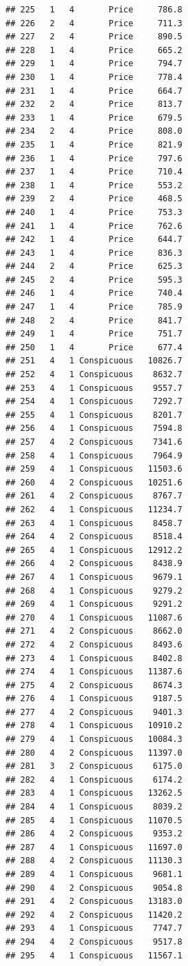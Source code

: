 \documentclass[12pt,]{krantz}
\theoremstyle{definition}
\theoremstyle{definition}
\theoremstyle{remark}
\begin{document}
\begin{verbatim}
## 225   1   4       Price     786.8
## 226   2   4       Price     711.3
## 227   2   4       Price     890.5
## 228   1   4       Price     665.2
## 229   1   4       Price     794.7
## 230   1   4       Price     778.4
## 231   1   4       Price     664.7
## 232   2   4       Price     813.7
## 233   1   4       Price     679.5
## 234   2   4       Price     808.0
## 235   1   4       Price     821.9
## 236   1   4       Price     797.6
## 237   1   4       Price     710.4
## 238   1   4       Price     553.2
## 239   2   4       Price     468.5
## 240   1   4       Price     753.3
## 241   1   4       Price     762.6
## 242   1   4       Price     644.7
## 243   1   4       Price     836.3
## 244   2   4       Price     625.3
## 245   2   4       Price     595.3
## 246   1   4       Price     740.4
## 247   1   4       Price     785.9
## 248   2   4       Price     841.7
## 249   1   4       Price     751.7
## 250   1   4       Price     677.4
## 251   4   1 Conspicuous   10826.7
## 252   4   1 Conspicuous    8632.7
## 253   4   1 Conspicuous    9557.7
## 254   4   1 Conspicuous    7292.7
## 255   4   1 Conspicuous    8201.7
## 256   4   1 Conspicuous    7594.8
## 257   4   2 Conspicuous    7341.6
## 258   4   1 Conspicuous    7964.9
## 259   4   1 Conspicuous   11503.6
## 260   4   2 Conspicuous   10251.6
## 261   4   2 Conspicuous    8767.7
## 262   4   1 Conspicuous   11234.7
## 263   4   1 Conspicuous    8458.7
## 264   4   2 Conspicuous    8518.4
## 265   4   1 Conspicuous   12912.2
## 266   4   2 Conspicuous    8438.9
## 267   4   1 Conspicuous    9679.1
## 268   4   1 Conspicuous    9279.2
## 269   4   1 Conspicuous    9291.2
## 270   4   1 Conspicuous   11087.6
## 271   4   2 Conspicuous    8662.0
## 272   4   2 Conspicuous    8493.6
## 273   4   1 Conspicuous    8402.8
## 274   4   1 Conspicuous   11387.6
## 275   4   2 Conspicuous    8674.3
## 276   4   1 Conspicuous    9187.5
## 277   4   2 Conspicuous    9401.3
## 278   4   1 Conspicuous   10910.2
## 279   4   1 Conspicuous   10084.3
## 280   4   2 Conspicuous   11397.0
## 281   3   2 Conspicuous    6175.0
## 282   4   1 Conspicuous    6174.2
## 283   4   1 Conspicuous   13262.5
## 284   4   1 Conspicuous    8039.2
## 285   4   1 Conspicuous   11070.5
## 286   4   2 Conspicuous    9353.2
## 287   4   1 Conspicuous   11697.0
## 288   4   2 Conspicuous   11130.3
## 289   4   1 Conspicuous    9681.1
## 290   4   2 Conspicuous    9054.8
## 291   4   2 Conspicuous   13183.0
## 292   4   2 Conspicuous   11420.2
## 293   4   1 Conspicuous    7747.7
## 294   4   2 Conspicuous    9517.8
## 295   4   1 Conspicuous   11567.1

\end{verbatim}
\end{document}
